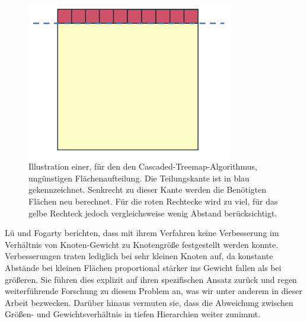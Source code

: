 \begin{figure}
    \centering
    \includegraphics[width=0.8\textwidth]{images/cascadedBadExample.png}
    \caption{Illustration einer, für den den Cascaded-Treemap-Algorithmus, ungünstigen Flächenaufteilung. Die Teilungskante ist in blau gekennzeichnet. Senkrecht zu dieser Kante werden die Benötigten Flächen neu berechnet. Für die roten Rechtecke wird zu viel, für das gelbe Rechteck jedoch vergleichsweise wenig Abstand berücksichtigt.}
    \label{fig:cascadedBadExample}
\end{figure}


Lü und Fogarty berichten, dass mit ihrem Verfahren keine Verbesserung im Verhältnis von Knoten-Gewicht zu Knotengröße festgestellt werden konnte. Verbesserungen traten lediglich bei sehr kleinen Knoten auf, da konstante Abstände bei kleinen Flächen proportional stärker ins Gewicht fallen als bei größeren. Sie führen dies explizit auf ihren spezifischen Ansatz zurück und regen weiterführende Forschung zu diesem Problem an, was wir unter anderem in dieser Arbeit bezwecken. Darüber hinaus vermuten sie, dass die Abweichung zwischen Größen- und Gewichtsverhältnis in tiefen Hierarchien weiter zunimmt.

